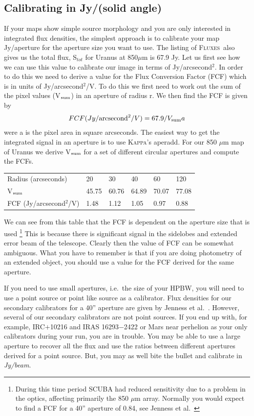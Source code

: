 \documentclass[twoside,11pt]{article}
\newcommand{\Kappa}{\xref{\textsc{Kappa}}{sun95}{}}
\newcommand{\fluxes}{\xref{\textsc{Fluxes}}{sun213}{}}
\newcommand{\task}[1]{\textsf{#1}}
\newcommand{\aperadd}{\xref{\task{aperadd}}{sun95}{APERADD}}
\newcommand{\xref}[3]{#1}
\newcommand{\xlabel}[1]{}
\renewcommand{\_}{\texttt{\symbol{95}}}
\begin{document}
\subsection{\xlabel{calibration_Jy/aperture} Calibrating in Jy/(solid
angle)\label{Calibration_aperture}}

If your maps show simple source morphology and you are only interested
in integrated flux densities, the simplest approach is to calibrate
your map Jy/aperture for the aperture size you want to use.  The
listing of \fluxes\ also gives us the total flux, S$_{tot}$ for Uranus
at 850$\mu$m is 67.9 Jy.  Let us first see how we can use this value
to calibrate our image in terms of Jy/arcsecond$^2$.  In order to do
this we need to derive a value for the Flux Conversion Factor (FCF)
which is in units of Jy/arcsecond$^2$/V. To do this we first need to
work out the sum of the pixel values (V$_{\rm sum}$) in an aperture of
radius r.  We then find the FCF is given by \begin{equation}
FCF(Jy/{\rm arcsecond}^2/V)=67.9/V_{\rm sum}a \end{equation} were a is
the pixel area in square arcseconds.  The easiest way to get the
integrated signal in an aperture is to use \Kappa's \aperadd.  For our
850 $\mu$m map of Uranus we derive V$_{\rm sum}$ for a set of
different circular apertures and compute the FCFs.


\begin{tabular}[c]{llllll}
Radius (arcseconds) & 20 & 30 & 40 & 60 & 120 \\
V$_{\rm sum}$ & 45.75 & 60.76 & 64.89 & 70.07 & 77.08 \\
FCF (Jy/arcsecond$^2$/V) & 1.48 & 1.12 & 1.05 & 0.97 & 0.88 \\
\end{tabular}

We can see from this table that the FCF is dependent on the aperture
size that is used \footnote{During this time period SCUBA had reduced
sensitivity due to a problem in the optics, affecting primarily the
850 $\mu$m array.  Normally you would expect to find a FCF for a 40''
aperture of 0.84, see Jenness et al.\  \cite{Jenness01}} This is
because there is significant signal in the sidelobes and extended
error beam of the telescope.  Clearly then the value of FCF can be
somewhat ambiguous.  What you have to remember is that if you are
doing photometry of an extended object, you should use a value for the
FCF derived for the same aperture.

If you need to use small apertures, i.e.\ the size of your HPBW, you will need
to use a point source or point like source as a calibrator.  Flux densities
for our secondary calibrators for a 40'' aperture are given by Jenness et al.\
\cite{Jenness01}.  However, several of our secondary calibrators are not point
sources.  If you end up with, for example, IRC$+$10216 and IRAS 16293$-$2422
or Mars near perhelion as your only calibrators during your run, you are in
trouble.  You may be able to use a large aperture to recover all the flux and
use the ratios between different apertures derived for a point source.  But,
you may as well bite the bullet and calibrate in {\it Jy/beam}.
\end{document}
